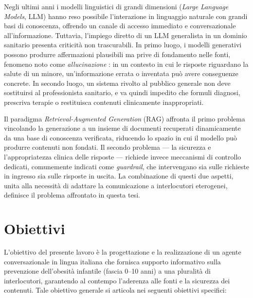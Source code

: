 Negli ultimi anni i modelli linguistici di grandi dimensioni
(\emph{Large Language Models}, LLM) hanno reso possibile l'interazione in
linguaggio naturale con grandi basi di conoscenza, offrendo un canale di
accesso immediato e conversazionale all'informazione. Tuttavia, l'impiego
diretto di un LLM generalista in un dominio sanitario presenta criticit\`a non
trascurabili. In primo luogo, i modelli generativi possono produrre affermazioni
plausibili ma prive di fondamento nelle fonti, fenomeno noto come
\emph{allucinazione} \cite{ji_hallucination}: in un contesto in cui le risposte
riguardano la salute di un minore, un'informazione errata o inventata pu\`o avere
conseguenze concrete. In secondo luogo, un sistema rivolto al pubblico generale
non deve sostituirsi al professionista sanitario, e va quindi impedito che
formuli diagnosi, prescriva terapie o restituisca contenuti clinicamente
inappropriati.

Il paradigma \emph{Retrieval-Augmented Generation} (RAG) \cite{lewis_rag}
affronta il primo problema vincolando la generazione a un insieme di documenti
recuperati dinamicamente da una base di conoscenza verificata, riducendo lo
spazio in cui il modello pu\`o produrre contenuti non fondati. Il secondo
problema --- la sicurezza e l'appropriatezza clinica delle risposte --- richiede
invece meccanismi di controllo dedicati, comunemente indicati come
\emph{guardrail}, che intervengano sia sulle richieste in ingresso sia sulle
risposte in uscita. La combinazione di questi due aspetti, unita alla necessit\`a
di adattare la comunicazione a interlocutori eterogenei, definisce il problema
affrontato in questa tesi.

\section{Obiettivi}
\label{sec:obiettivi}

L'obiettivo del presente lavoro \`e la progettazione e la realizzazione di un
agente conversazionale in lingua italiana che fornisca supporto informativo
sulla prevenzione dell'obesit\`a infantile (fascia 0--10 anni) a una pluralit\`a
di interlocutori, garantendo al contempo l'aderenza alle fonti e la sicurezza
dei contenuti. Tale obiettivo generale si articola nei seguenti obiettivi
specifici:

